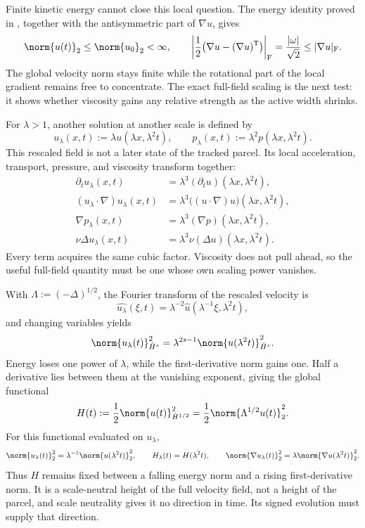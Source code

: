 Finite kinetic energy cannot close this local question. The energy identity proved in , together with the antisymmetric part of \(\nabla u\), gives
\[
  \norm{u(t)}_2
  \leq
  \norm{u_0}_2
  <\infty,
  \qquad
  \left|\frac12\bigl(\nabla u-(\nabla u)^{\mathsf T}\bigr)\right|_{\mathrm F}
  =
  \frac{|\omega|}{\sqrt2}
  \leq
  |\nabla u|_{\mathrm F}.
\]
The global velocity norm stays finite while the rotational part of the local gradient remains free to concentrate. The exact full-field scaling is the next test: it shows whether viscosity gains any relative strength as the active width shrinks.


For \(\lambda>1\), another solution at another scale is defined by
\[
  u_\lambda(x,t)
  :=
  \lambda u(\lambda x,\lambda^2t),
  \qquad
  p_\lambda(x,t)
  :=
  \lambda^2p(\lambda x,\lambda^2t).
\]
This rescaled field is not a later state of the tracked parcel. Its local acceleration, transport, pressure, and viscosity transform together:
\[
\begin{aligned}
  \partial_tu_\lambda(x,t)
  &=
  \lambda^3(\partial_tu)(\lambda x,\lambda^2t),
  \\
  (u_\lambda\cdot\nabla)u_\lambda(x,t)
  &=
  \lambda^3\bigl((u\cdot\nabla)u\bigr)(\lambda x,\lambda^2t),
  \\
  \nabla p_\lambda(x,t)
  &=
  \lambda^3(\nabla p)(\lambda x,\lambda^2t),
  \\
  \nu\Delta u_\lambda(x,t)
  &=
  \lambda^3\nu(\Delta u)(\lambda x,\lambda^2t).
\end{aligned}
\]
Every term acquires the same cubic factor. Viscosity does not pull ahead, so the useful full-field quantity must be one whose own scaling power vanishes.


With \(\Lambda:=(-\Delta)^{1/2}\), the Fourier transform of the rescaled velocity is
\[
  \widehat{u_\lambda}(\xi,t)
  =
  \lambda^{-2}\widehat u(\lambda^{-1}\xi,\lambda^2t),
\]
and changing variables yields
\[
  \norm{u_\lambda(t)}_{\dot H^s}^2
  =
  \lambda^{2s-1}
  \norm{u(\lambda^2t)}_{\dot H^s}^2.
\]
Energy loses one power of \(\lambda\), while the first-derivative norm gains one. Half a derivative lies between them at the vanishing exponent, giving the global functional
\[
  H(t)
  :=
  \frac12\norm{u(t)}_{\dot H^{1/2}}^2
  =
  \frac12\norm{\Lambda^{1/2}u(t)}_2^2.
\]
For this functional evaluated on \(u_\lambda\),
\[
  \norm{u_\lambda(t)}_2^2
  =
  \lambda^{-1}\norm{u(\lambda^2t)}_2^2,
  \qquad
  H_\lambda(t)=H(\lambda^2t),
  \qquad
  \norm{\nabla u_\lambda(t)}_2^2
  =
  \lambda\norm{\nabla u(\lambda^2t)}_2^2.
\]
Thus \(H\) remains fixed between a falling energy norm and a rising first-derivative norm. It is a scale-neutral height of the full velocity field, not a height of the parcel, and scale neutrality gives it no direction in time. Its signed evolution must supply that direction.

